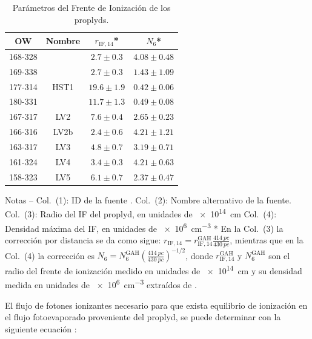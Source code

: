 \begin{table}
  \centering
  \caption{Parámetros del Frente de Ionización de los proplyds.}
  \label{tab:Prop-IF-par}
  \begin{tabular}{cccc} \toprule
    OW      & Nombre & $r_{\mathrm{IF}, 14}$*     & $N_6$* \\
    \midrule
    168-328 &        & $2.7 \pm 0.3$  & $4.08 \pm 0.48$ \\
    169-338 &        & $2.7 \pm 0.3$  & $1.43 \pm 1.09$ \\
    177-314 & HST1   & $19.6 \pm 1.9$ & $0.42 \pm 0.06$ \\ 
    180-331 &        & $11.7 \pm 1.3$ & $0.49 \pm 0.08$ \\
    167-317 & LV2    & $7.6 \pm 0.4$  & $2.65 \pm 0.23$ \\
    166-316 & LV2b   & $2.4 \pm 0.6$  & $4.21 \pm 1.21$ \\
    163-317 & LV3    & $4.8 \pm 0.7$  & $3.19 \pm 0.71$ \\
    161-324 & LV4    & $3.4 \pm 0.3$  & $4.21 \pm 0.63$ \\
    158-323 & LV5    & $6.1 \pm 0.7$  & $2.37 \pm 0.47$ \\
  \bottomrule
  \end{tabular}
  \begin{minipage}{0.9\linewidth}
    \footnotesize
    Notas --
%
  Col.~(1): ID de la fuente \citep{ODell:1994a}.
%
  Col.~(2): Nombre alternativo de la fuente.
%
  Col.~(3): Radio del IF del proplyd, en unidades de \SI{e14}{cm}
%
  Col.~(4): Densidad máxima del IF, en unidades de \SI{e6}{cm^{-3}}
%
  * En la Col.~(3) la corrección por distancia se da como sigue: $r_{\mathrm{IF}, 14} = r_{\mathrm{IF}, 14}^{\mathrm{GAH}}\frac{\SI{414}{pc}}{\SI{430}{pc}}$, mientras que en la Col.~(4) la corrección es $N_6 = N_6^{\mathrm{GAH}}\left(\frac{\SI{414}{pc}}{\SI{430}{pc}}\right)^{-1/2}$, donde $r_{\mathrm{IF}, 14}^{\mathrm{GAH}}$ y $N_6^{\mathrm{GAH}}$ son el radio del frente de ionización medido en unidades de \SI{e14}{cm} y su densidad medida en unidades de \SI{e6}{cm^{-3}} extraídos de \citet{Garcia-Arredondo:2001}.
  \end{minipage}
\end{table}

El flujo de fotones ionizantes necesario para que exista equilibrio de ionización en el flujo fotoevaporado proveniente del proplyd, se puede determinar con la siguiente ecuación \citep{Henney:2001}:

